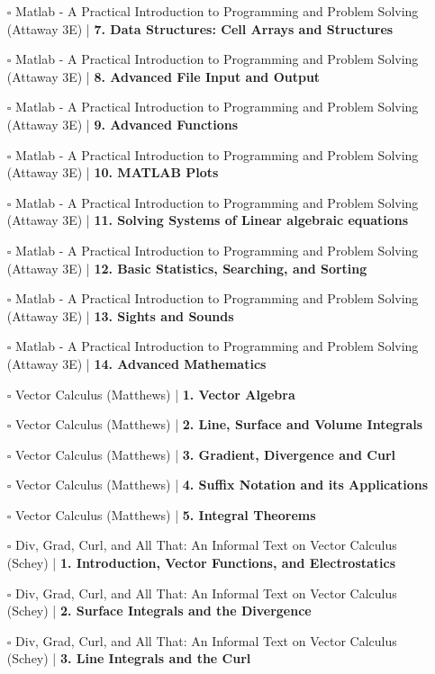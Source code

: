 \documentclass[a4, landscape, 12pt]{article}
\newcommand{\checkbox}{$\square$}%
\begin{document}
\begin{itemize}
{}
\item [\checkbox] Matlab - A Practical Introduction to Programming and Problem Solving (Attaway 3E)  | \textbf{7. Data Structures: Cell Arrays and Structures
}
\item [\checkbox] Matlab - A Practical Introduction to Programming and Problem Solving (Attaway 3E)  | \textbf{8. Advanced File Input and Output
}
\item [\checkbox] Matlab - A Practical Introduction to Programming and Problem Solving (Attaway 3E)  | \textbf{9. Advanced Functions
}
\item [\checkbox] Matlab - A Practical Introduction to Programming and Problem Solving (Attaway 3E)  | \textbf{10. MATLAB Plots
}
\item [\checkbox] Matlab - A Practical Introduction to Programming and Problem Solving (Attaway 3E)  | \textbf{11. Solving Systems of Linear algebraic equations
}
\item [\checkbox] Matlab - A Practical Introduction to Programming and Problem Solving (Attaway 3E)  | \textbf{12. Basic Statistics, Searching, and Sorting
}
\item [\checkbox] Matlab - A Practical Introduction to Programming and Problem Solving (Attaway 3E)  | \textbf{13. Sights and Sounds
}
\item [\checkbox] Matlab - A Practical Introduction to Programming and Problem Solving (Attaway 3E)  | \textbf{14. Advanced Mathematics
}
\item [\checkbox] Vector Calculus (Matthews)  | \textbf{1. Vector Algebra
}
\item [\checkbox] Vector Calculus (Matthews)  | \textbf{2. Line, Surface and Volume Integrals
}
\item [\checkbox] Vector Calculus (Matthews)  | \textbf{3. Gradient, Divergence and Curl
}
\item [\checkbox] Vector Calculus (Matthews)  | \textbf{4. Suffix Notation and its Applications
}
\item [\checkbox] Vector Calculus (Matthews)  | \textbf{5. Integral Theorems
}
\item [\checkbox] Div, Grad, Curl, and All That: An Informal Text on Vector Calculus (Schey)  | \textbf{1. Introduction, Vector Functions, and Electrostatics
}
\item [\checkbox] Div, Grad, Curl, and All That: An Informal Text on Vector Calculus (Schey)  | \textbf{2. Surface Integrals and the Divergence
}
\item [\checkbox] Div, Grad, Curl, and All That: An Informal Text on Vector Calculus (Schey)  | \textbf{3. Line Integrals and the Curl
}
\end{itemize}
\end{document}
